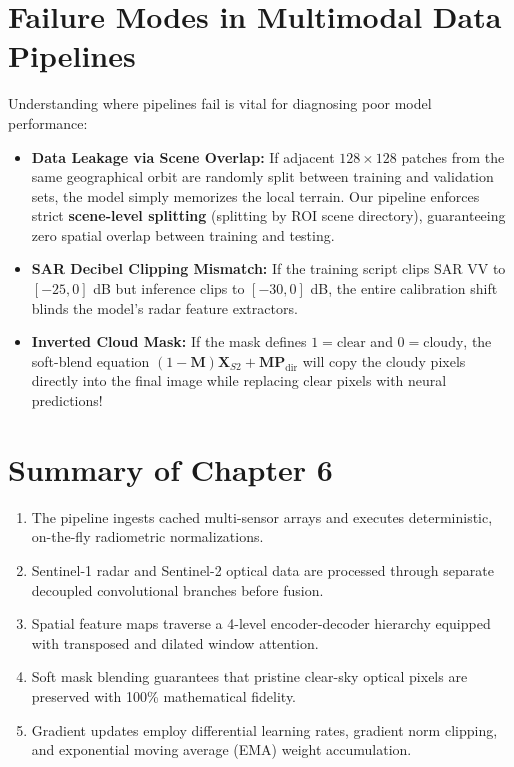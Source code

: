 \section{Failure Modes in Multimodal Data Pipelines}
Understanding where pipelines fail is vital for diagnosing poor model performance:
\begin{itemize}
    \item \textbf{Data Leakage via Scene Overlap:} If adjacent $128 \times 128$ patches from the same geographical orbit are randomly split between training and validation sets, the model simply memorizes the local terrain. Our pipeline enforces strict \textbf{scene-level splitting} (splitting by ROI scene directory), guaranteeing zero spatial overlap between training and testing.
    \item \textbf{SAR Decibel Clipping Mismatch:} If the training script clips SAR VV to $[-25, 0]$ dB but inference clips to $[-30, 0]$ dB, the entire calibration shift blinds the model's radar feature extractors.
    \item \textbf{Inverted Cloud Mask:} If the mask defines $1 = \text{clear}$ and $0 = \text{cloudy}$, the soft-blend equation $(1-\mathbf{M})\mathbf{X}_{S2} + \mathbf{M}\mathbf{P}_{\text{dir}}$ will copy the cloudy pixels directly into the final image while replacing clear pixels with neural predictions!
\end{itemize}

\section{Summary of Chapter 6}
\begin{enumerate}
    \item The pipeline ingests cached multi-sensor arrays and executes deterministic, on-the-fly radiometric normalizations.
    \item Sentinel-1 radar and Sentinel-2 optical data are processed through separate decoupled convolutional branches before fusion.
    \item Spatial feature maps traverse a 4-level encoder-decoder hierarchy equipped with transposed and dilated window attention.
    \item Soft mask blending guarantees that pristine clear-sky optical pixels are preserved with 100\% mathematical fidelity.
    \item Gradient updates employ differential learning rates, gradient norm clipping, and exponential moving average (EMA) weight accumulation.
\end{enumerate}

